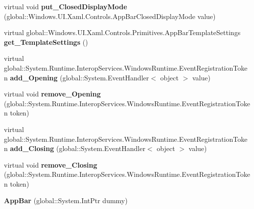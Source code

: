 \begin{DoxyCompactItemize}
virtual void {\bfseries put\+\_\+\+Closed\+Display\+Mode} (global\+::\+Windows.\+U\+I.\+Xaml.\+Controls.\+App\+Bar\+Closed\+Display\+Mode value)
\item 
\mbox{\label{class_windows_1_1_u_i_1_1_xaml_1_1_controls_1_1_app_bar_a2e23c12e2a789785cc3543b45ad5e974}} 
virtual global\+::\+Windows.\+U\+I.\+Xaml.\+Controls.\+Primitives.\+App\+Bar\+Template\+Settings {\bfseries get\+\_\+\+Template\+Settings} ()
\item 
\mbox{\label{class_windows_1_1_u_i_1_1_xaml_1_1_controls_1_1_app_bar_a355e1e4a38bea8069ad912132936c3e5}} 
virtual global\+::\+System.\+Runtime.\+Interop\+Services.\+Windows\+Runtime.\+Event\+Registration\+Token {\bfseries add\+\_\+\+Opening} (global\+::\+System.\+Event\+Handler$<$ object $>$ value)
\item 
\mbox{\label{class_windows_1_1_u_i_1_1_xaml_1_1_controls_1_1_app_bar_a1912d3027c4521c8dcda380a853d656e}} 
virtual void {\bfseries remove\+\_\+\+Opening} (global\+::\+System.\+Runtime.\+Interop\+Services.\+Windows\+Runtime.\+Event\+Registration\+Token token)
\item 
\mbox{\label{class_windows_1_1_u_i_1_1_xaml_1_1_controls_1_1_app_bar_a669f99f9098da8948468675637292c38}} 
virtual global\+::\+System.\+Runtime.\+Interop\+Services.\+Windows\+Runtime.\+Event\+Registration\+Token {\bfseries add\+\_\+\+Closing} (global\+::\+System.\+Event\+Handler$<$ object $>$ value)
\item 
\mbox{\label{class_windows_1_1_u_i_1_1_xaml_1_1_controls_1_1_app_bar_a4c8dc6e33234645dfc8de750f6172acc}} 
virtual void {\bfseries remove\+\_\+\+Closing} (global\+::\+System.\+Runtime.\+Interop\+Services.\+Windows\+Runtime.\+Event\+Registration\+Token token)
\item 
\mbox{\label{class_windows_1_1_u_i_1_1_xaml_1_1_controls_1_1_app_bar_a7504764229ad22d4e22e97ea76d33d92}} 
{\bfseries App\+Bar} (global\+::\+System.\+Int\+Ptr dummy)
\item 

\end{DoxyCompactItemize}
